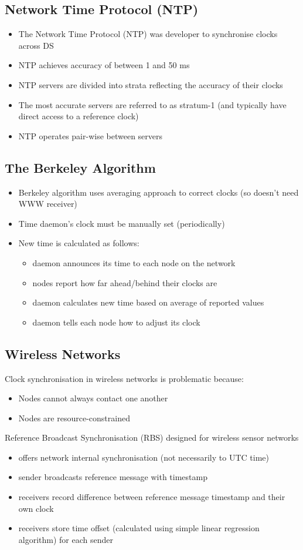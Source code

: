 \subsection{Network Time Protocol (NTP)}
\begin{itemize}
	\item The Network Time Protocol (NTP) was developer to synchronise clocks across DS
	\item NTP achieves accuracy of between 1 and 50 ms
	\item NTP servers are divided into strata reflecting the accuracy of their clocks
	\item The most accurate servers are referred to as stratum-1 (and typically have direct access to a reference clock)
	\item NTP operates pair-wise between servers	
\end{itemize}

\subsection{The Berkeley Algorithm}
\begin{itemize}
	\item Berkeley algorithm uses averaging approach to correct clocks (so doesn't need WWW receiver)
	\item Time daemon's clock must be manually set (periodically)
	\item New time is calculated as follows:
	\begin{itemize}
		\item daemon announces its time to each node on the network
		\item nodes report how far ahead/behind their clocks are
		\item daemon calculates new time based on average of reported values
		\item daemon tells each node how to adjust its clock
	\end{itemize}
\end{itemize}

\subsection{Wireless Networks}
Clock synchronisation in wireless networks is problematic because:
\begin{itemize}
	\item Nodes cannot always contact one another
	\item Nodes are resource-constrained	
\end{itemize}
Reference Broadcast Synchronisation (RBS) designed for wireless sensor networks
\begin{itemize}
	\item offers network internal synchronisation (not necessarily to UTC time)
	\item sender broadcasts reference message with timestamp
	\item receivers record difference between reference message timestamp and their own clock
	\item receivers store time offset (calculated using simple linear regression algorithm) for each sender
\end{itemize}

